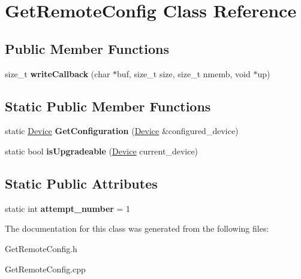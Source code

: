 \hypertarget{classGetRemoteConfig}{}\section{Get\+Remote\+Config Class Reference}
\label{classGetRemoteConfig}
\subsection*{Public Member Functions}
\begin{DoxyCompactItemize}
\item 
\mbox{\label{classGetRemoteConfig_a2dacced69140eb882b7896fb14e8bf87}} 
size\+\_\+t {\bfseries write\+Callback} (char $\ast$buf, size\+\_\+t size, size\+\_\+t nmemb, void $\ast$up)
\end{DoxyCompactItemize}
\subsection*{Static Public Member Functions}
\begin{DoxyCompactItemize}
\item 
\mbox{\label{classGetRemoteConfig_af62a8872ab4f1931f84e633bc04610d3}} 
static \hyperlink{classDevice}{Device} {\bfseries Get\+Configuration} (\hyperlink{classDevice}{Device} \&configured\+\_\+device)
\item 
\mbox{\label{classGetRemoteConfig_affe2522e13726086087de6790d81d58d}} 
static bool {\bfseries is\+Upgradeable} (\hyperlink{classDevice}{Device} current\+\_\+device)
\end{DoxyCompactItemize}
\subsection*{Static Public Attributes}
\begin{DoxyCompactItemize}
\item 
\mbox{\label{classGetRemoteConfig_ada0c0c829bb87f1760bfd10b48c3ad98}} 
static int {\bfseries attempt\+\_\+number} = 1
\end{DoxyCompactItemize}


The documentation for this class was generated from the following files\+:\begin{DoxyCompactItemize}
\item 
Get\+Remote\+Config.\+h\item 
Get\+Remote\+Config.\+cpp\end{DoxyCompactItemize}
